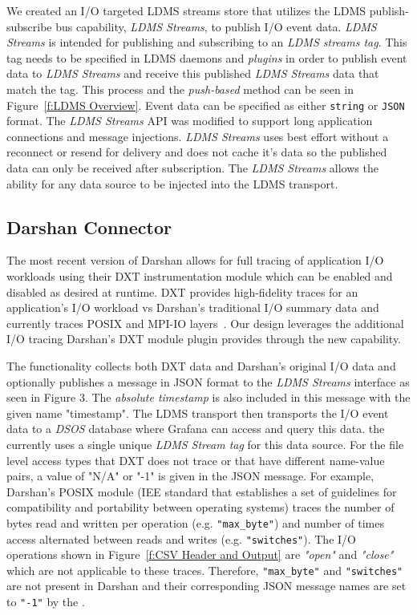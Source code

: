 We created an I/O targeted LDMS streams store that utilizes the LDMS publish-subscribe bus capability, \emph{LDMS Streams}, to publish I/O event data. \emph{LDMS Streams} is intended for publishing and subscribing to an \emph{LDMS streams tag}. 
This tag needs to be specified in LDMS daemons and \emph{plugins} in order to publish event data to \emph{LDMS Streams} and receive this published \emph{LDMS Streams} data that match the tag. This process and the \emph{push-based} method can be seen in Figure~\ref{f:LDMS Overview}. Event data can be specified as either \texttt{string} or \texttt{JSON} format. The \emph{LDMS Streams} API was modified to support long application connections and message injections. \emph{LDMS Streams} uses best effort without a reconnect or resend for delivery and does not cache it's data so the published data can only be received after subscription. The \emph{LDMS Streams} allows the ability for any data source to be injected into the LDMS transport.

\subsection{Darshan Connector}

The most recent version of Darshan allows for full tracing of application I/O workloads using their DXT instrumentation module which can be enabled and disabled as desired at runtime. DXT provides high-fidelity traces for an application's I/O workload vs Darshan's traditional I/O summary data and currently traces POSIX and MPI-IO layers~\cite{darshan-runtime}. Our design leverages the additional I/O tracing Darshan's DXT module plugin provides through the new \connector{} capability.


The \connector{} functionality collects both DXT data and Darshan's original I/O data and optionally publishes a message in JSON format to the \emph{LDMS Streams} interface as seen in Figure 3. The \emph{absolute timestamp} is also included in this message with the given name "timestamp". The LDMS transport then transports the I/O event data to a \emph{DSOS} database where Grafana can access and query this data. the \connector{} currently uses a single unique \emph{LDMS Stream tag} for this data source. For the file level access types that DXT does not trace or that have different name-value pairs, a value of "N/A" or "-1" is given in the JSON message. For example, Darshan's POSIX module (IEE standard that establishes a set of guidelines for compatibility and portability between operating systems) traces the number of bytes read and written per operation (e.g. \texttt{"max\_byte"}) and number of times access alternated between reads and writes (e.g. \texttt{"switches"}). The I/O operations shown in Figure~\ref{f:CSV Header and Output} are \emph{"open"} and \emph{"close"} which are not applicable to these traces. Therefore, \texttt{"max\_byte"} and \texttt{"switches"} are not present in Darshan and their corresponding JSON message names are set to \texttt{"-1"} by the \connector{}.    

